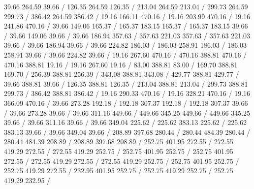 {\setsolid
{} 39.66 264.59 39.66 /
\setsolid
{} 126.35 264.59 126.35 /
\setsolid
{} 213.04 264.59 213.04 /
\setsolid
{} 299.73 264.59 299.73 /
\setsolid
{} 386.42 264.59 386.42 /
\setsolid
{} 19.16 166.11 470.16 /
\setsolid
{} 19.16 203.99 470.16 /
\setsolid
{} 19.16 241.86 470.16 /
\setsolid
{} 39.66 149.06 165.37 /
 165.37 183.15 165.37 /
 165.37 183.15 39.66 /
 39.66 149.06 39.66 /
\setsolid
{} 39.66 186.94 357.63 /
 357.63 221.03 357.63 /
 357.63 221.03 39.66 /
 39.66 186.94 39.66 /
\setsolid
{} 39.66 224.82 186.03 /
 186.03 258.91 186.03 /
 186.03 258.91 39.66 /
 39.66 224.82 39.66 /
\setsolid
{} 19.16 267.60 470.16 /
 470.16 388.81 470.16 /
 470.16 388.81 19.16 /
 19.16 267.60 19.16 /
\setsolid
{} 83.00 388.81 83.00 /
\setsolid
{} 169.70 388.81 169.70 /
\setsolid
{} 256.39 388.81 256.39 /
\setsolid
{} 343.08 388.81 343.08 /
\setsolid
{} 429.77 388.81 429.77 /
\setsolid
{} 39.66 388.81 39.66 /
\setsolid
{} 126.35 388.81 126.35 /
\setsolid
{} 213.04 388.81 213.04 /
\setsolid
{} 299.73 388.81 299.73 /
\setsolid
{} 386.42 388.81 386.42 /
\setsolid
{} 19.16 290.33 470.16 /
\setsolid
{} 19.16 328.21 470.16 /
\setsolid
{} 19.16 366.09 470.16 /
\setsolid
{} 39.66 273.28 192.18 /
 192.18 307.37 192.18 /
 192.18 307.37 39.66 /
 39.66 273.28 39.66 /
\setsolid
{} 39.66 311.16 449.66 /
 449.66 345.25 449.66 /
 449.66 345.25 39.66 /
 39.66 311.16 39.66 /
\setsolid
{} 39.66 349.04 225.62 /
 225.62 383.13 225.62 /
 225.62 383.13 39.66 /
 39.66 349.04 39.66 /
\setsolid
{} 208.89 397.68 280.44 /
 280.44 484.39 280.44 /
 280.44 484.39 208.89 /
 208.89 397.68 208.89 /
\setsolid
{} 252.75 401.95 272.55 /
 272.55 419.29 272.55 /
 272.55 419.29 252.75 /
 252.75 401.95 252.75 /
\setsolid
{} 252.75 401.95 272.55 /
 272.55 419.29 272.55 /
 272.55 419.29 252.75 /
 252.75 401.95 252.75 /
\setsolid
{} 252.75 419.29 272.55 /
\setsolid
{} 232.95 401.95 252.75 /
 252.75 419.29 252.75 /
 252.75 419.29 232.95 /
}
